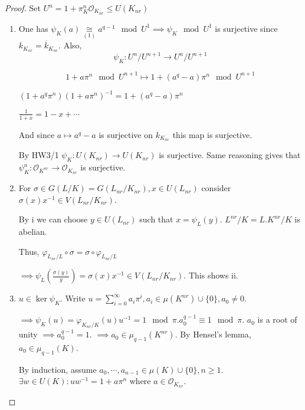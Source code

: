\documentclass{article}
\theoremstyle{definition}
\numberwithin{theorem}{subsection}
\begin{document}
    \begin{proof}
        Set \(U^n = 1 + \pi_K^n \mathcal{O}_{K_{nr}} \leq U(K_{nr})\)
        
        \begin{enumerate}[label=\roman*)]
            \item One has \(\psi_K(a) \underset{(1)}{\cong} a^{q-1} \mod U^1 \implies \psi_K \mod U^1\) is surjective since \(k_{K_{nr}} = \overline{k}_{K_{nr}}\). Also,
            \[
                \psi_K : U^n / U^{n+1} \to U^n / U^{n+1} 
            \]

            \[
                1 + a \pi^n \mod U^{n+1} \mapsto  1 + (a^q - a) \pi^n \mod U^{n+1}
            \]

            \((1+a^q \pi^n)(1 + a \pi^n) ^{-1} = 1 + (a^q - a) \pi^n\)

            \(\frac{1}{1+x} = 1 - x + \cdots\)
            
            And since \(a \mapsto a^q - a\) is surjective on \(k_{K_{nr}}\) this map is surjective.

            By HW3/1 \(\psi_K : U(K_{nr}) \to U(K_{nr})\) is surjective. Same reasoning gives that \(\psi_K^a : \mathcal{O}_{K^{nr}} \to \mathcal{O}_{K_{nr}}\) is surjective.

            \item For \(\sigma \in G(L / K) = G(L_{nr} / K_{nr}), x\in U(L_{nr})\) consider \(\sigma (x) x ^{-1} \in V(L_{nr} / K_{nr})\).
            
            By i we can choose \(y\in U(L_{nr})\) such that \(x = \psi_L (y)\). \(L^{nr} / K = L . K^{nr} / K\) is abelian.

            Thus, \(\varphi_{L_{nr} / L} \circ \sigma = \sigma \circ \varphi_{L_{nr} / L}\)
            
            \(\implies \psi_L \left( \frac{\sigma(y)}{y} \right) = \sigma (x) x ^{-1} \in V(L_{nr} / K_{nr})\). This shows ii. 
            
            \item \(u\in \ker \psi_K\). Write \(u = \sum_{i=0}^{\infty} a_i \pi^i, a_i \in \mu(K^{nr}) \cup \{ 0 \}, a_0\neq 0\).
            
            \(\implies \psi_K(u) = \varphi_{K_{nr} / K}(u) u ^{-1} = 1 \mod \pi. a_0^{q-1} \equiv 1\mod\pi\). \(a_0\) is a root of unity \(\implies a_0^{q-1} = 1\). \(\implies a_0 \in \mu_{q-1}(K^{nr})\). By Hensel's lemma, \(a_0\in \mu_{q-1}(K)\).
            
            By induction, assume \(a_0, \cdots , a_{n-1} \in \mu(K) \cup \{ 0 \}, n \geq 1\). \(\exists w\in U(K): u w ^{-1} = 1  + a \pi^n\) where \(a \in \mathcal{O}_{K_{nr}}\).


\end{enumerate}
\end{proof}
\end{document}
